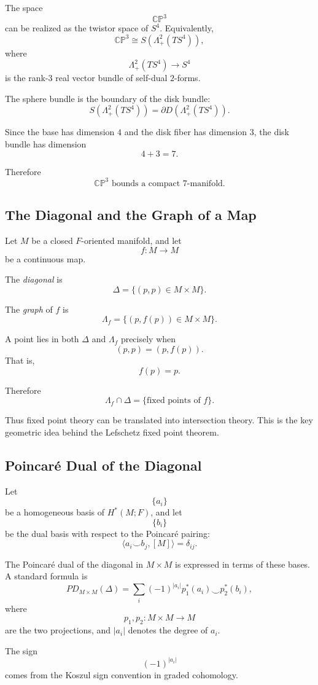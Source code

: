 \documentclass[12pt,a4paper]{article}
\theoremstyle{notespace}
\begin{document}
The space
\[
\mathbb{CP}^3
\]
can be realized as the twistor space of \(S^4\). Equivalently,
\[
\mathbb{CP}^3\cong S(\Lambda^2_+(TS^4)),
\]
where
\[
\Lambda^2_+(TS^4)\to S^4
\]
is the rank-\(3\) real vector bundle of self-dual \(2\)-forms.

The sphere bundle is the boundary of the disk bundle:
\[
S(\Lambda^2_+(TS^4))=\partial D(\Lambda^2_+(TS^4)).
\]

Since the base has dimension \(4\) and the disk fiber has dimension \(3\), the
disk bundle has dimension
\[
4+3=7.
\]

Therefore
\[
\boxed{
	\mathbb{CP}^3\text{ bounds a compact }7\text{-manifold.}
}
\]

\subsection{The Diagonal and the Graph of a Map}

Let \(M\) be a closed \(F\)-oriented manifold, and let
\[
f:M\to M
\]
be a continuous map.

The \emph{diagonal} is
\[
\Delta=\{(p,p)\in M\times M\}.
\]

The \emph{graph} of \(f\) is
\[
\Lambda_f=\{(p,f(p))\in M\times M\}.
\]

A point lies in both \(\Delta\) and \(\Lambda_f\) precisely when
\[
(p,p)=(p,f(p)).
\]
That is,
\[
f(p)=p.
\]

Therefore
\[
\boxed{
	\Lambda_f\cap \Delta
	=
	\{\text{fixed points of }f\}.
}
\]

Thus fixed point theory can be translated into intersection theory. This is the
key geometric idea behind the Lefschetz fixed point theorem.

\subsection{Poincar\'e Dual of the Diagonal}

Let
\[
\{a_i\}
\]
be a homogeneous basis of \(H^*(M;F)\), and let
\[
\{b_i\}
\]
be the dual basis with respect to the Poincar\'e pairing:
\[
\langle a_i\smile b_j,[M]\rangle=\delta_{ij}.
\]

The Poincar\'e dual of the diagonal in \(M\times M\) is expressed in terms of
these bases. A standard formula is
\[
PD_{M\times M}(\Delta)
=
\sum_i (-1)^{|a_i|}
p_1^*(a_i)\smile p_2^*(b_i),
\]
where
\[
p_1,p_2:M\times M\to M
\]
are the two projections, and \(|a_i|\) denotes the degree of \(a_i\).

The sign
\[
(-1)^{|a_i|}
\]
comes from the Koszul sign convention in graded cohomology.
\end{document}
